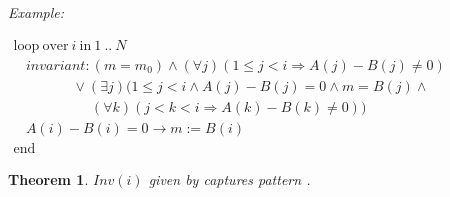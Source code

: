 \documentclass[a4paper,10pt]{article}
\newcommand{\idx}{\ensuremath{i}\xspace}
\newcommand{\KWloop}{\ensuremath{\mathrm{loop}~}}
\newcommand{\KWend}{\ensuremath{\mathrm{end}~}}
\newcommand{\KWover}{\ensuremath{\mathrm{over}~}}
\newcommand{\KWin}{\ensuremath{~\mathrm{in}~}}
\newcommand{\impl}{\ensuremath{\Longrightarrow}}
\newcommand{\patternexample}{\noindent\textit{Example:}\xspace}
\newcommand{\Inv}[1]{\ensuremath{\mathit{Inv}(#1)\xspace}}
\newtheorem{theorem}{Theorem}[section]
\begin{document}
\patternexample

$\begin{array}{l}
  \KWloop \KWover i \KWin 1~..~N \\
  ~~~~ \textit{invariant}: (m = m_0) \land (\forall j)(1\leq j < i \impl A(j)-B(j)\neq0)\\
  ~~~~~~~~~~~~~~~~~~~ \lor (\exists j)(1\leq j < i \land A(j)-B(j)= 0 \land m = B(j) \land \\
  ~~~~~~~~~~~~~~~~~~~~~~~~~ (\forall k)(j < k < i \impl A(k)-B(k)\neq0))\\
  ~~~~ A(i)-B(i)=0 \rightarrow m := B(i)\\
  \KWend
\end{array}$

\begin{theorem}
  \Inv{\idx} given by \curinv captures pattern \curpattern.
\end{theorem}
\end{document}
